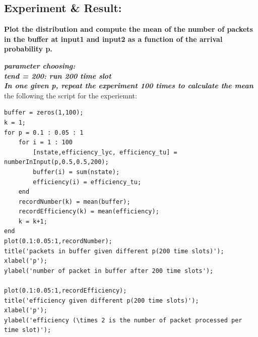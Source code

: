 \documentclass[twoside]{article}
\begin{document}
\subsection{\normalsize{Experiment \& Result:}}
\noindent \textbf {Plot the distribution and compute the mean of the number of packets in the buffer at input1 and input2 as a function of the arrival probability p.}\\
\begin{multicols*}{2}
\noindent \textbf \emph{parameter choosing:\\ tend = 200: run 200 time slot\\ In one given p, repeat the experiment 100 times to calculate the mean}\\
the following the script for the experiemnt:\\
\begin{lstlisting}
buffer = zeros(1,100);
k = 1;
for p = 0.1 : 0.05 : 1
    for i = 1 : 100
        [nstate,efficiency_lyc, efficiency_tu] = numberInInput(p,0.5,0.5,200);
        buffer(i) = sum(nstate);
        efficiency(i) = efficiency_tu;
    end
    recordNumber(k) = mean(buffer);
    recordEfficiency(k) = mean(efficiency);
    k = k+1;
end
plot(0.1:0.05:1,recordNumber);
title('packets in buffer given different p(200 time slots)');
xlabel('p');
ylabel('number of packet in buffer after 200 time slots');

plot(0.1:0.05:1,recordEfficiency);
title('efficiency given different p(200 time slots)');
xlabel('p');
ylabel('efficiency (\times 2 is the number of packet processed per time slot)');


\end{lstlisting}
\end{multicols*}
\end{document}
